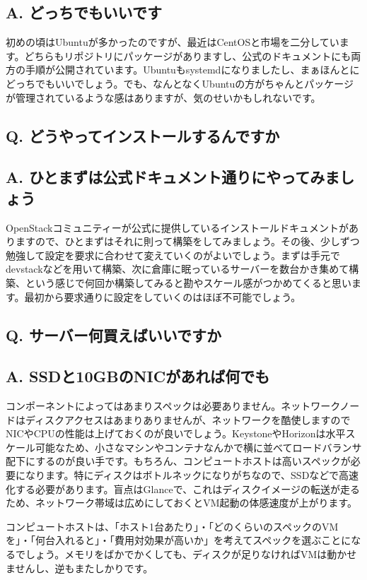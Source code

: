 \documentclass[9pt,b5paper,tombo,openany]{jsbook}
\begin{document}
\subsection*{{\LARGE\bfseries A.} どっちでもいいです}
初めの頃はUbuntuが多かったのですが、最近はCentOSと市場を二分しています。どちらもリポジトリにパッケージがありますし、公式のドキュメントにも両方の手順が公開されています。Ubuntuもsystemdになりましたし、まぁほんとにどっちでもいいでしょう。でも、なんとなくUbuntuの方がちゃんとパッケージが管理されているような感はありますが、気のせいかもしれないです。

\subsection*{{\LARGE\bfseries Q.} どうやってインストールするんですか}
\subsection*{{\LARGE\bfseries A.} ひとまずは公式ドキュメント通りにやってみましょう}
OpenStackコミュニティーが公式に提供しているインストールドキュメントがありますので、ひとまずはそれに則って構築をしてみましょう。その後、少しずつ勉強して設定を要求に合わせて変えていくのがよいでしょう。まずは手元でdevstackなどを用いて構築、次に倉庫に眠っているサーバーを数台かき集めて構築、という感じで何回か構築してみると勘やスケール感がつかめてくると思います。最初から要求通りに設定をしていくのはほぼ不可能でしょう。

\subsection*{{\LARGE\bfseries Q.} サーバー何買えばいいですか}
\subsection*{{\LARGE\bfseries A.} SSDと10GBのNICがあれば何でも}
コンポーネントによってはあまりスペックは必要ありません。ネットワークノードはディスクアクセスはあまりありませんが、ネットワークを酷使しますのでNICやCPUの性能は上げておくのが良いでしょう。KeystoneやHorizonは水平スケール可能なため、小さなマシンやコンテナなんかで横に並べてロードバランサ配下にするのが良い手です。もちろん、コンピュートホストは高いスペックが必要になります。特にディスクはボトルネックになりがちなので、SSDなどで高速化する必要があります。盲点はGlanceで、これはディスクイメージの転送が走るため、ネットワーク帯域は広めにしておくとVM起動の体感速度が上がります。

コンピュートホストは、「ホスト1台あたり」・「どのくらいのスペックのVMを」・「何台入れると」・「費用対効果が高いか」を考えてスペックを選ぶことになるでしょう。メモリをばかでかくしても、ディスクが足りなければVMは動かせませんし、逆もまたしかりです。
\end{document}
